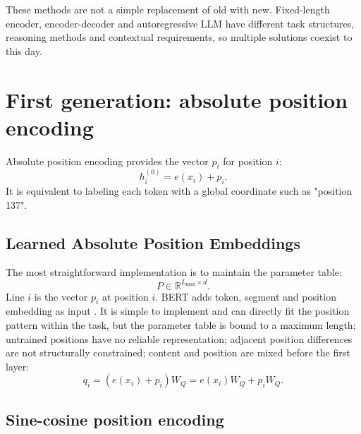 \documentclass[UTF8,fontset=none,a4paper,10pt]{ctexart}
\newcommand{\R}{\mathbb{R}}
\begin{document}
These methods are not a simple replacement of old with new. Fixed-length encoder, encoder-decoder and autoregressive LLM have different task structures, reasoning methods and contextual requirements, so multiple solutions coexist to this day.

\section{First generation: absolute position encoding}

Absolute position encoding provides the vector $p_i$ for position $i$:
\begin{equation}
  h_i^{(0)}=e(x_i)+p_i.
  \label{eq:absolute}
\end{equation}
It is equivalent to labeling each token with a global coordinate such as "position 137".

\subsection{Learned Absolute Position Embeddings}

The most straightforward implementation is to maintain the parameter table:
\begin{equation}
  P\in\R^{L_{\max}\times d}.
  \label{eq:learned-table}
\end{equation}
Line $i$ is the vector $p_i$ at position $i$. BERT adds token, segment and position embedding as input \cite{devlin2019}. It is simple to implement and can directly fit the position pattern within the task, but the parameter table is bound to a maximum length; untrained positions have no reliable representation; adjacent position differences are not structurally constrained; content and position are mixed before the first layer:
\begin{equation}
  q_i=(e(x_i)+p_i)W_Q=e(x_i)W_Q+p_iW_Q.
  \label{eq:absolute-proj}
\end{equation}

\subsection{Sine-cosine position encoding}
\end{document}
